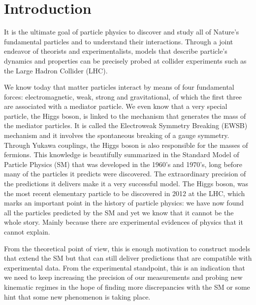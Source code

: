 
\chapter{Introduction}
\label{chapter:introduction}

It is the ultimate goal of particle physics to discover and study all of Nature's fundamental particles and to understand their interactions. Through a joint endeavor of theorists and experimentalists, models that describe particle's dynamics and properties can be precisely probed at collider experiments such as the Large Hadron Collider (LHC). 

We know today that matter particles interact by means of four fundamental forces: electromagnetic, weak, strong and gravitational, of which the first three are associated with a mediator particle. We even know that a very special particle, the Higgs boson, is linked to the mechanism that generates the mass of the mediator particles. It is called the Electroweak Symmetry Breaking (EWSB) mechanism and it involves the spontaneous breaking of a gauge symmetry. Through Yukawa couplings, the Higgs boson is also responsible for the masses of fermions. This knowledge is beautifully summarized in the Standard Model of Particle Physics (SM) that was developed in the 1960's and 1970's, long before many of the particles it predicts were discovered. The extraordinary precision of the predictions it delivers make it a very successful model. The Higgs boson, was the most recent elementary particle to be discovered in 2012 at the LHC, which marks an important point in the history of particle physics: we have now found all the particles predicted by the SM and yet we know that it cannot be the whole story. Mainly because there are experimental evidences of physics that it cannot explain.

From the theoretical point of view, this is enough motivation to construct models that extend the SM but that can still deliver predictions that are compatible with experimental data. From the experimental standpoint, this is an indication that we need to keep increasing the precision of our measurements and probing new kinematic regimes in the hope of finding more discrepancies with the SM or some hint that some new phenomenon is taking place.

